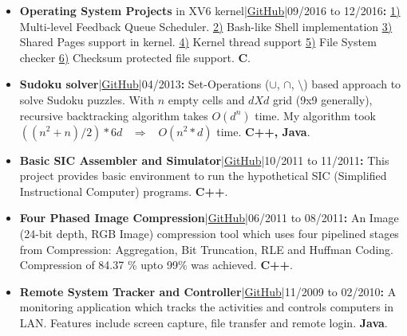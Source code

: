 \documentclass[a4paper, 10pt]{extarticle}
\begin{document}
\begin{large}
\begin{itemize}
    \item{\textbf{Operating System Projects} in XV6
kernel|\href{https://github.com/pradeep0605/CS537-IntroToOS}{GitHub}|09/2016 to
12/2016\textbf{{\Large{:}}}
\href{https://github.com/pradeep0605/CS537-IntroToOS/tree/master/Project2b}{1)}
Multi-level Feedback Queue Scheduler.
\href{https://github.com/pradeep0605/CS537-IntroToOS-Project2a}{2)} Bash-like
Shell implementation
\href{https://github.com/pradeep0605/CS537-IntroToOS-Project3b}{3)} Shared Pages
support in kernel.
\href{https://github.com/pradeep0605/CS537-IntroToOS/tree/master/Project4b}{4)}
Kernel thread support
\href{https://github.com/pradeep0605/CS537-IntroToOS/tree/master/Project5a}{5)}
File System checker
\href{https://github.com/pradeep0605/CS537-IntroToOS/tree/master/Project5b}{6)}
Checksum protected file support. \textbf{C}.}
    \vspace{-.1cm}
    
    \item{\textbf{Sudoku
solver}|\href{https://github.com/pradeep0605/Sudoku_Solver}{GitHub}|04/2013\textbf{{\Large{:}}}
Set-Operations ({$\cup$}, {$\cap$}, {$\setminus$})  based approach to solve
Sudoku puzzles. With $n$ empty cells and $d X d$ grid (9x9 generally), recursive
backtracking algorithm takes  $O(d^n)$ time. My algorithm took $((n^2 + n) / 2)
* 6d$ \ $\Longrightarrow$ \ $O(n^2 *d)$ time. \textbf{C++, Java}.}  
    \vspace{-.1cm}
    
    \item{\textbf{Basic SIC Assembler and
Simulator}|\href{https://github.com/pradeep0605/SIC_assembler_and_simulator}{GitHub}|10/2011
to 11/2011\textbf{{\Large{:}}} This project provides basic environment to run
the hypothetical SIC (Simplified Instructional Computer) programs.
\textbf{C++}.} 
    \vspace{-.1cm}
    
     \item{\textbf{Four Phased Image
Compression}|\href{https://github.com/pradeep0605/FourPhasedImageCompressor}{GitHub}|06/2011
to 08/2011\textbf{{\Large{:}}} An Image (24-bit depth, RGB Image) compression
tool which uses four pipelined stages from Compression: Aggregation, Bit
Truncation, RLE and Huffman Coding. Compression of 84.37 \% upto 99\% was
achieved. \textbf{C++}.} 
    \vspace{-.1cm}
    
    \item{\textbf{Remote System Tracker and
Controller}|\href{https://github.com/pradeep0605/RemoteSystemTrackerAndController}{GitHub}|11/2009
to 02/2010\textbf{{\Large{:}}} A monitoring application which tracks the
activities and controls computers in LAN. Features include screen capture, file
transfer and remote login. \textbf{Java}.} 
    \vspace{-.1cm}
    

\end{itemize}
\end{large}
\end{document}
